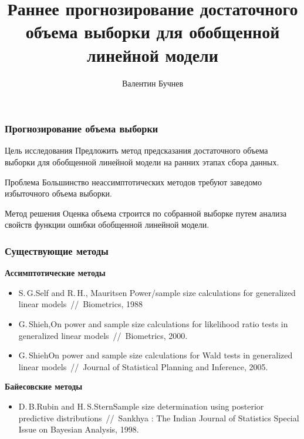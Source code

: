 \documentclass{beamer}
\title[\hbox to 56mm{Достаточный объем выборки  \hfill\insertframenumber\,/\,\inserttotalframenumber}]
{Раннее прогнозирование достаточного объема выборки для обобщенной линейной модели}
\author[В.\,С.~Бучнев]{Валентин Бучнев}
\institute{Московский физико-технический институт}
\date{\footnotesize{
\par\emph{Курс:} Численные методы обучения по прецедентам
(практика, В. В. Стрижов), группа 694, весна 2019
\par\emph{консультант:} А.\,В.~Грабовой
\date{qq}
}}
\begin{document}
\begin{frame}
\titlepage %
\end{frame}

\begin{frame}
\frametitle{Прогнозирование объема выборки}
\begin{block}{Цель исследования}
Предложить метод предсказания достаточного объема выборки для обобщенной линейной модели на ранних этапах сбора данных.
\end{block}
\begin{block}{Проблема}
Большинство неассимптотических методов требуют заведомо избыточного объема выборки.
\end{block}
\begin{block}{Метод решения}
Оценка объема строится по собранной выборке путем анализа свойств функции ошибки обобщенной линейной модели.
\end{block}

\end{frame}

\begin{frame}
\frametitle{Существующие методы}

\textbf{Ассимптотические методы}

\begin{itemize}
  \item S.\,G.\;Self and R.\,H.,\; Mauritsen Power/sample size calculations for generalized linear
models~//~Biometrics, 1988
  \item G.\,Shieh,\;On power and sample size calculations for likelihood ratio tests in generalized linear models~//~Biometrics, 2000.
  \item G.\,Shieh\;On power and sample size calculations for Wald tests in generalized linear models~//~Journal of Statistical Planning and Inference, 2005.
\end{itemize}

\textbf{Байесовские методы}

\begin{itemize}
  \item D.\,B.\;Rubin and H.\,S.\;Stern\;Sample size determination using posterior predictive distributions~//~Sankhya : The Indian Journal of Statistics Special Issue on Bayesian Analysis, 1998.
\end{itemize}

\end{frame}
\end{document}
